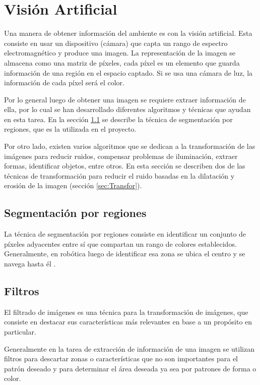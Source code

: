 \section{Visión Artificial} \label{sect:Vision_Artificial}

Una manera de obtener información del ambiente es con la visión artificial. Esta consiste en usar un dispositivo (cámara) que capta un rango de espectro electromagnético y produce una imagen. La representación de la imagen se almacena como una matriz de píxeles, cada píxel es un elemento que guarda información de una región en el espacio captado. Si se usa una cámara de luz, la información de cada píxel será el color. \cite{AiRobotics}  

Por lo general luego de obtener una imagen se requiere extraer información de ella, por lo cual se han desarrollado diferentes algoritmos y t\'ecnicas que ayudan en esta tarea. En la sección \ref{sec:Segmentacion} se describe la t\'ecnica de segmentaci\'on por regiones, que es la utilizada en el proyecto. 

Por otro lado, existen varios algoritmos que se dedican a la transformación de las imágenes para reducir
ruidos, compensar problemas de iluminación, extraer formas, identificar objetos, entre otros. En esta sección se describen dos de las técnicas de transformación para reducir el ruido basadas en la dilatación y erosión de la imagen (secci\'on \ref{sec:Transfor}). 
 
\subsection{Segmentaci\'on por regiones}\label{sec:Segmentacion}

La técnica de segmentación por regiones consiste en identificar un conjunto de píxeles adyacentes entre sí que compartan un rango de colores establecidos. Generalmente, en robótica luego de identificar esa zona se ubica el centro y se navega hasta él \cite{BookOpenCv}. 

\subsection{Filtros}
El filtrado de imágenes es una técnica para la transformación de imágenes, que consiste en destacar  sus características más relevantes en base a un propósito en particular. 

Generalmente en la tarea de extracción de información de una imagen se utilizan filtros para descartar zonas o características que no son importantes para el patrón deseado y para determinar el área deseada ya sea por patrones de forma o color.

